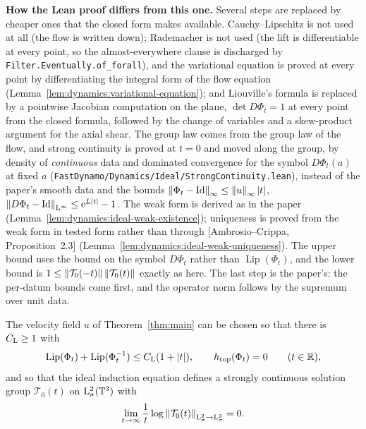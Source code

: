 \textbf{How the Lean proof differs from this one.}  Several steps are replaced by cheaper ones
that the closed form makes available.  Cauchy--Lipschitz is not used at all (the flow is
written down); Rademacher is not used (the lift is differentiable at every point, so the
almost-everywhere clause is discharged by \texttt{Filter.Eventually.of\_forall}), and the
variational equation is proved at every point by differentiating the integral form of the flow
equation (Lemma~\ref{lem:dynamics:variational-equation}); and Liouville's formula is replaced
by a pointwise Jacobian computation on the plane, $\det D\Phi_t=1$ at every point from the
closed formula, followed by the change of variables and a skew-product argument for the axial
shear.  The group law comes from the group law of the flow, and strong continuity is proved at
$t=0$ and moved along the group, by density of \emph{continuous} data and dominated convergence
for the symbol $D\Phi_t(a) $ at fixed $a $
(\texttt{FastDynamo/Dynamics/Ideal/StrongContinuity.lean}), instead of the paper's smooth data
and the bounds $\left\|\Phi_t-\mathrm{Id}\right\|_\infty\leq\left\|u\right\|_\infty\left\lvert t\right\rvert $,
$\left\|D\Phi_t-\mathrm{Id}\right\|_{\mathrm{L}^\infty}\leq\mathrm{e}^{L\left\lvert t\right\rvert}-1 $.  The weak form is derived as in the paper
(Lemma~\ref{lem:dynamics:ideal-weak-existence}); uniqueness is proved from the weak form in
tested form rather than through [Ambrosio--Crippa, Proposition~2.3]
(Lemma~\ref{lem:dynamics:ideal-weak-uniqueness}).  The upper bound uses the bound on the
symbol $D\Phi_t $ rather than $\operatorname{Lip}(\Phi_t) $, and the lower bound is
$1\leq\left\|\mathcal T_0(-t)\right\|\left\|\mathcal T_0(t)\right\|$ exactly as here.  The last step is the
paper's: the per-datum bounds come first, and the operator norm follows by the supremum over
unit data.

\begin{proposition}
  \label{prop:main-lagrangian}
  \leanok
  The velocity field $u $ of Theorem~\ref{thm:main} can be chosen so that there is
  $C_{\rm L}\geq1 $ with
  \[
    \operatorname{Lip}(\Phi_t)+\operatorname{Lip}(\Phi_t^{-1})
    \leq C_{\rm L}(1+\left\lvert t\right\rvert),
    \qquad
    h_{\mathrm{top}}(\Phi_t)=0
    \qquad(t\in\mathbb{R}),
  \]
  and so that the ideal induction equation defines a strongly continuous solution group
  $\mathcal T_0(t) $ on $\mathrm{L}^2_\sigma(\mathbb{T}^3) $ with
  \[
    \lim_{t\to\infty}\frac1t
    \log\left\|\mathcal T_0(t)\right\|_{\mathrm{L}^2_\sigma\to\mathrm{L}^2_\sigma}=0.
  \]
\end{proposition}

